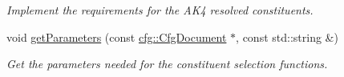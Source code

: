 \begin{DoxyCompactItemize}
\begin{DoxyCompactList}\small\item\em Implement the requirements for the A\-K4 resolved constituents. \end{DoxyCompactList}\item 
\hypertarget{classTTMConstituentReqs_a6b72bd3d3605f24c240053a9ac0f36df}{void \hyperlink{classTTMConstituentReqs_a6b72bd3d3605f24c240053a9ac0f36df}{get\-Parameters} (const \hyperlink{classcfg_1_1CfgDocument}{cfg\-::\-Cfg\-Document} $\ast$, const std\-::string \&)}\label{classTTMConstituentReqs_a6b72bd3d3605f24c240053a9ac0f36df}

\begin{DoxyCompactList}\small\item\em Get the parameters needed for the constituent selection functions. \end{DoxyCompactList}\end{DoxyCompactItemize}
